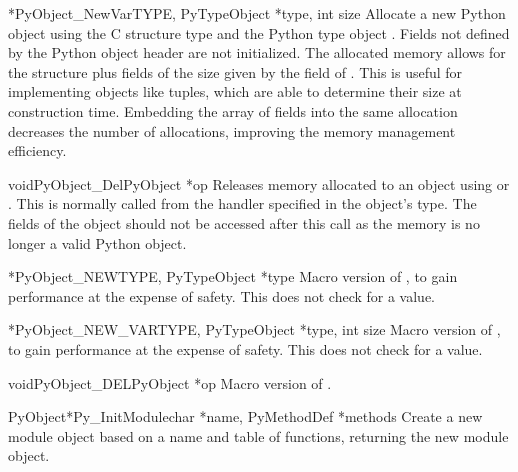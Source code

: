 \begin{cfuncdesc}{*}{PyObject_NewVar}{TYPE, PyTypeObject *type,
                                                int size}
  Allocate a new Python object using the C structure type 
  and the Python type object .  Fields not defined by the
  Python object header are not initialized.  The allocated memory
  allows for the  structure plus  fields of the
  size given by the  field of .  This is
  useful for implementing objects like tuples, which are able to
  determine their size at construction time.  Embedding the array of
  fields into the same allocation decreases the number of allocations,
  improving the memory management efficiency.
\end{cfuncdesc}

\begin{cfuncdesc}{void}{PyObject_Del}{PyObject *op}
  Releases memory allocated to an object using
   or .  This
  is normally called from the  handler specified in
  the object's type.  The fields of the object should not be accessed
  after this call as the memory is no longer a valid Python object.
\end{cfuncdesc}

\begin{cfuncdesc}{*}{PyObject_NEW}{TYPE, PyTypeObject *type}
  Macro version of , to gain performance at
  the expense of safety.  This does not check  for a \NULL{}
  value.
\end{cfuncdesc}

\begin{cfuncdesc}{*}{PyObject_NEW_VAR}{TYPE, PyTypeObject *type,
                                                int size}
  Macro version of , to gain performance
  at the expense of safety.  This does not check  for a
  \NULL{} value.
\end{cfuncdesc}

\begin{cfuncdesc}{void}{PyObject_DEL}{PyObject *op}
  Macro version of .
\end{cfuncdesc}

\begin{cfuncdesc}{PyObject*}{Py_InitModule}{char *name,
                                            PyMethodDef *methods}
  Create a new module object based on a name and table of functions,
  returning the new module object.

\end{cfuncdesc}


